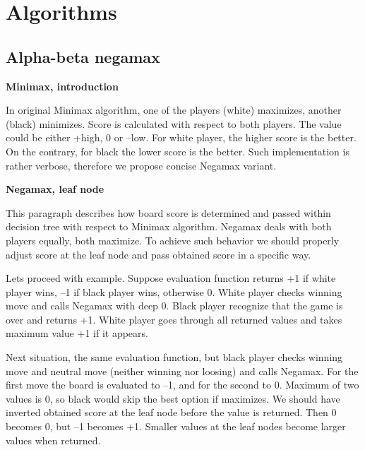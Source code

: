 \section{Algorithms}

\subsection{Alpha-beta negamax}

\textbf{Minimax, introduction}

\vspace{0.5em}

In original Minimax algorithm, one of the players (white) maximizes, another
(black) minimizes. Score is calculated with respect to both players. The value
could be either +high, 0 or --low. For white player, the higher score is the
better. On the contrary, for black the lower score is the better. Such
implementation is rather verbose, therefore we propose concise Negamax variant.

\vspace{0.5em}

\textbf{Negamax, leaf node}

\vspace{0.5em}

This paragraph describes how board score is determined and passed within
decision tree with respect to Minimax algorithm. Negamax deals with both
players equally, both maximize. To achieve such behavior we should properly
adjust score at the leaf node and pass obtained score in a specific way.

\vspace{0.5em}

Lets proceed with example. Suppose evaluation function returns +1 if white
player wins, --1 if black player wins, otherwise 0. White player checks
winning move and calls Negamax with deep 0. Black player recognize that the
game is over and returns +1. White player goes through all returned values and
takes maximum value +1 if it appears.

\vspace{0.5em}

Next situation, the same evaluation function, but black player checks winning
move and neutral move (neither winning nor loosing) and calls Negamax. For the
first move the board is evaluated to --1, and for the second to 0. Maximum of
two values is 0, so black would skip the best option if maximizes. We should
have inverted obtained score at the leaf node before the value is returned.
Then 0 becomes 0, but --1 becomes +1. Smaller values at the leaf nodes become
larger values when returned.

